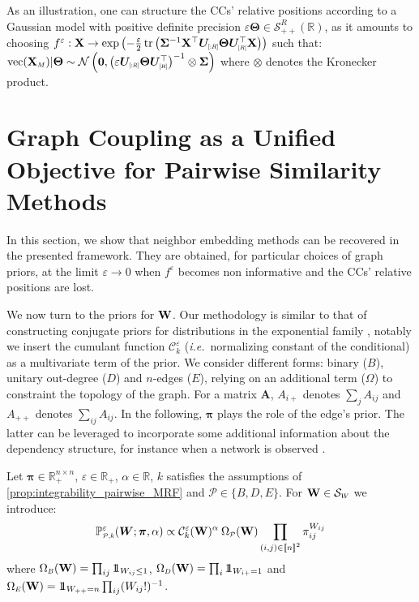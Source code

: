 As an illustration, one can structure the CCs' relative positions according to a Gaussian model with positive definite precision $\varepsilon \bm{\Theta} \in \mathcal{S}_{++}^R(\mathbb{R})$, as it amounts to choosing $f^{\varepsilon} : \Xb \to \exp \left(-\frac{\varepsilon}{2} \operatorname{tr}\left(\bm{\Sigma}^{-1}\Xb^\top\bm{U}_{\scaleto{[:R]}{5pt}}  \bm{\Theta}\bm{U}^\top_{\scaleto{[R]}{5pt}} \Xb\right)\right)$ such that: $\mathrm{vec}(\Xb_{\scaleto{M}{4pt}}) | \bm{\Theta} \sim \mathcal{N}\left(\bm{0}, \left(\varepsilon \bm{U}_{\scaleto{[:R]}{5pt}}  \bm{\Theta}\bm{U}^\top_{\scaleto{[R]}{5pt}}\right)^{-1} \otimes \bm{\Sigma}\right)$ where $\otimes$ denotes the Kronecker product.

\section{Graph Coupling as a Unified Objective for Pairwise Similarity Methods}\label{sec:GC_unified}

In this section, we show that neighbor embedding methods can be recovered in the presented framework. They are obtained, for particular choices of graph priors, at the limit $\varepsilon \to 0$ when $f^{\varepsilon}$ becomes non informative and the CCs' relative positions are lost. 

We now turn to the priors for $\mathbf{W}$. Our methodology is similar to that of constructing conjugate priors for distributions in the exponential family \cite{wainwright2008graphical}, notably we insert the cumulant function $\mathcal{C}_k^{\varepsilon}$ (\textit{i.e.}\ normalizing constant of the conditional) as a multivariate term of the prior. 
We consider different forms: binary ($B$), unitary out-degree ($D$) and $n$-edges ($E$), relying on an additional term ($\Omega$) to constraint the topology of the graph. For a matrix $\bm{A}$, $A_{i+}$ denotes $\sum_j A_{ij}$ and $A_{++}$ denotes $\sum_{ij} A_{ij}$. In the following, $\bm{\pi}$ plays the role of the edge's prior. The latter can be leveraged to incorporate some additional information about the dependency structure, for instance when a network is observed \cite{li2020high}. 

\begin{definition}\label{def:prior_W}
Let $\bm{\pi} \in \mathbb{R}_+^{n \times n}$, $\varepsilon \in \mathbb{R}_+$, $\alpha \in \mathbb{R}$, $k$ satisfies the assumptions of \cref{prop:integrability_pairwise_MRF} and $\mathcal{P} \in \{B,D,E\}$. For $\Wb \in \mathcal{S}_{\scaleto{W}{4pt}}$ we introduce:
$$\mathbb{P}_{\scaleto{\mathcal{P},k}{5pt}}^{\varepsilon}(\bm{W}; \bm{\pi}, \alpha) \propto \mathcal{C}^{\varepsilon}_k(\Wb)^{\alpha} \: \Omega_{\scaleto{\mathcal{P}}{4pt}}(\Wb) \prod_{(i,j) \in \integ{n}^2} \pi_{ij}^{W_{ij}}$$
where $\Omega_{\scaleto{B}{4pt}}(\Wb) = \prod_{ij} \ind_{W_{ij} \leq 1}$, $\Omega_{\scaleto{D}{4pt}}(\Wb) = \prod_{i} \ind_{W_{i+} = 1}$ and $\Omega_{\scaleto{E}{4pt}}(\Wb) = \ind_{W_{++} = n}\prod_{ij}(W_{ij}!)^{-1}$.
\end{definition}

